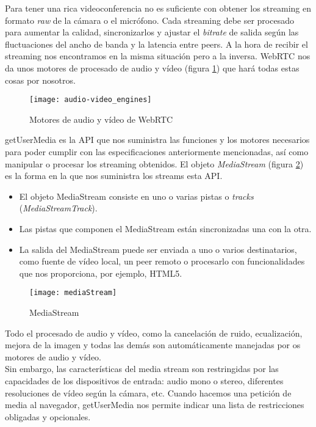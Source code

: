 Para tener una rica videoconferencia no es suficiente con obtener los streaming en formato \textit{raw} de la cámara o el micrófono. Cada streaming debe ser procesado para aumentar la calidad, sincronizarlos y ajustar el \textit{bitrate} de salida según las fluctuaciones del ancho de banda y la latencia entre peers. A la hora de recibir el streaming nos encontramos en la misma situación pero a la inversa. WebRTC nos da unos motores de procesado de audio y vídeo (figura \ref{fig:audio-video_engines}) que hará todas estas cosas por nosotros.\\

\begin{figure}[htb]
\centering
\texttt{[image: audio-video\_engines]}
\caption{Motores de audio y vídeo de WebRTC }
\label{fig:audio-video_engines}
\end{figure}

getUserMedia es la API que nos suministra las funciones y los motores necesarios para poder cumplir con las especificaciones anteriormente mencionadas, así como manipular o procesar los streaming obtenidos. El objeto \textit{MediaStream} (figura \ref{fig:mediaStream}) es la forma en la que nos suministra los streams esta API.\\

\begin{itemize}
\item El objeto MediaStream consiste en uno o varias pistas o \textit{tracks} (\textit{MediaStreamTrack}).
\item Las pistas que componen el MediaStream están sincronizadas una con la otra.
\item La salida del MediaStream puede ser enviada a uno o varios destinatarios, como fuente de vídeo local, un peer remoto o procesarlo con funcionalidades que nos proporciona, por ejemplo, HTML5.
\end{itemize}

\begin{figure}[htb]
\centering
\texttt{[image: mediaStream]}
\caption{MediaStream}
\label{fig:mediaStream}
\end{figure}

Todo el procesado de audio y vídeo, como la cancelación de ruido, ecualización, mejora de la imagen y todas las demás son automáticamente manejadas por os motores de audio y vídeo.\\

Sin embargo, las características del media stream son restringidas por las capacidades de los dispositivos de entrada: audio mono o stereo, diferentes resoluciones de vídeo según la cámara, etc. Cuando hacemos una petición de media al navegador, getUserMedia nos permite indicar una lista de restricciones obligadas y opcionales.\\

